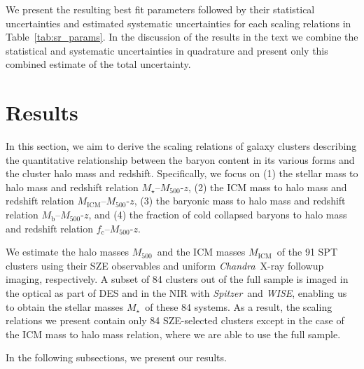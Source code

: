 \documentclass[useAMS,usenatbib,iop,numberedappendix]{mn2e}
\newcommand{\Mfiveoo}{\ensuremath{M_{500}}}
\newcommand{\redshift}{\ensuremath{z}}
\newcommand{\CHANDRA}{\emph{Chandra}}
\newcommand{\Spitzer}{\emph{Spitzer}}
\newcommand{\WISE}{\emph{WISE}}
\newcommand{\Mstar}{\ensuremath{M_{\star}}}
\newcommand{\Mgas}{\ensuremath{M_{\mathrm{ICM}}}}
\newcommand{\Mbary}{\ensuremath{M_{\mathrm{b}}}}
\newcommand{\fcold}{\ensuremath{f_{\mathrm{c}}}}
\begin{document}
We present the resulting best fit parameters followed by their statistical uncertainties and estimated systematic uncertainties for each scaling relations in Table~\ref{tab:sr_params}.  In the discussion of the results in the text we combine the statistical and systematic uncertainties in quadrature and present only this combined estimate of the total uncertainty.


%
%

\section{Results}
\label{sec:scalingrelation}

In this section, we aim to derive the scaling relations of galaxy clusters describing the quantitative relationship between the baryon content in its various forms and the cluster halo mass and redshift.
Specifically, we focus on (1) the stellar mass to halo mass and redshift relation \Mstar--\Mfiveoo-\redshift, (2) the ICM mass to halo mass and redshift relation \Mgas--\Mfiveoo-\redshift, (3) the baryonic mass to halo mass and redshift relation \Mbary--\Mfiveoo-\redshift, and (4) the fraction of cold collapsed baryons to halo mass and redshift relation \fcold--\Mfiveoo-\redshift.

We estimate the halo masses \Mfiveoo\ and the ICM masses \Mgas\ of the 91 SPT clusters using their SZE observables and uniform \CHANDRA\ X-ray followup imaging, respectively. 
A subset of 84 clusters out of the full sample is imaged in the optical as part of DES and in the NIR with \Spitzer\ and \WISE, enabling us to obtain the stellar masses \Mstar\ of these 84 systems.
As a result, the scaling relations we present contain only 84 SZE-selected clusters except in the case of the ICM mass to halo mass relation, where we are able to use the full sample.

In the following subsections, we 
present our results.
\end{document}
